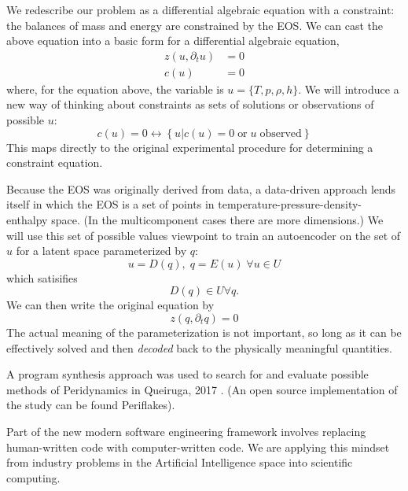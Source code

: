 \documentclass[]{article}
\begin{document}
We redescribe our problem as a differential algebraic equation
with a constraint: the balances of mass and energy are constrained by
the EOS. We can cast the above equation into a basic form for a
differential algebraic equation,
\begin{align}
  z( u, \partial_t u) &= 0 \\
  c(u) & = 0
\end{align}
where, for the equation above, the variable is $u=\{T,p,\rho,h\}$. We will introduce a new way of thinking about constraints as sets of
solutions or observations of possible $u$:
\begin{equation}
c(u)=0 \longleftrightarrow \left\{ u | c(u)=0 \;\text{or}\; u\; \text{observed} \right\}
\end{equation}
This maps directly to the original experimental procedure for
determining a constraint equation.

Because the EOS was originally derived from data, a data-driven
approach lends itself in which the EOS is a set of points in
temperature-pressure-density-enthalpy space. (In the multicomponent
cases there are more dimensions.)
We will use this set of possible values viewpoint to train an
autoencoder on the set of $u$ for a latent space parameterized by $q$:
\begin{equation}
u = D(q), \; q=E(u) \;\forall u \in U
\end{equation}
which satisifies
\begin{equation}
  D(q)\in U \forall q.
\end{equation}
We can then write the original equation by
\begin{equation}
z(q,\partial_t q)=0
\end{equation}
The actual meaning of the parameterization is not important, so long as
it can be effectively solved and then \emph{decoded} back to the
physically meaningful quantities.

\cite{wu_physics-informed_2018}
\cite{xie_tempogan:_2018}

 A program synthesis approach was used to search for and evaluate possible methods of Peridynamics in Queiruga, 2017 \cite{queiruga2017numerical}. (An open source implementation of the study can be found Periflakes)\cite{queiruga2018periflakes}.

Part of the new modern software engineering framework involves replacing
human-written code with computer-written code. We are applying this
mindset from industry problems in the Artificial
Intelligence space into scientific computing.
\end{document}
